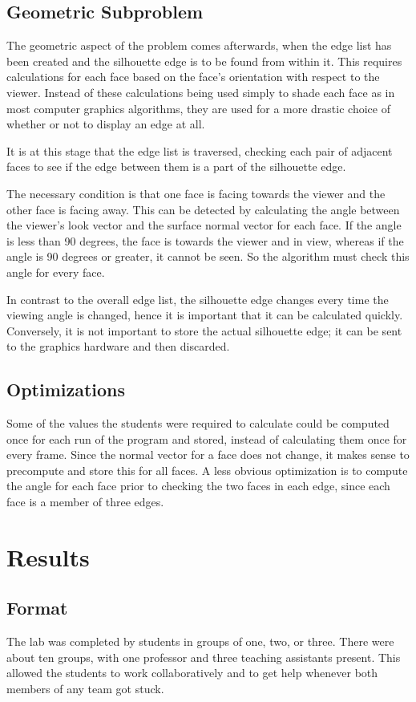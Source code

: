 \documentclass[10pt,twocolumn]{article}
\begin{document}
\subsection{Geometric Subproblem}
The geometric aspect of the problem comes afterwards, when the edge list has been created and the silhouette edge is to be found from within it.  This requires calculations for each face based on the face's orientation with respect to the viewer.  Instead of these calculations being used simply to shade each face as in most computer graphics algorithms, they are used for a more drastic choice of whether or not to display an edge at all.  

It is at this stage that the edge list is traversed, checking each pair of adjacent faces to see if the edge between them is a part of the silhouette edge.  

The necessary condition is that one face is facing towards the viewer and the other face is facing away.  This can be detected by calculating the angle between the viewer's look vector and the surface normal vector for each face.  If the angle is less than 90 degrees, the face is towards the viewer and in view, whereas if the angle is 90 degrees or greater, it cannot be seen.  So the algorithm must check this angle for every face.  

In contrast to the overall edge list, the silhouette edge changes every time the viewing angle is changed, hence it is important that it can be calculated quickly.  Conversely, it is not important to store the actual silhouette edge; it can be sent to the graphics hardware and then discarded.  

\subsection{Optimizations}
Some of the values the students were required to calculate could be computed once for each run of the program and stored, instead of calculating them once for every frame.  Since the normal vector for a face does not change, it makes sense to precompute and store this for all faces.  A less obvious optimization is to compute the angle for each face prior to checking the two faces in each edge, since each face is a member of three edges.  

\section{Results}
\subsection{Format}
The lab was completed by students in groups of one, two, or three.  There were about ten groups, with one professor and three teaching assistants present.  This allowed the students to work collaboratively and to get help whenever both members of any team got stuck.  
\end{document}

